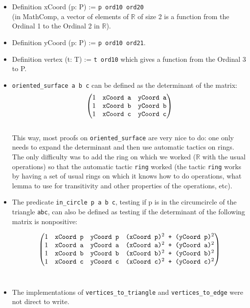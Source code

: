 \documentclass[a4paper,10pt]{article}
\def\definition#1#2{{\color{purple}Definition} {\color{blue}#1} := {\tt #2}}
\begin{document}
 \begin{itemize}
  \item \definition{xCoord (p: P)}{p ord10 ord20} \\(in {\sc MathComp}, a vector of elements of $\mathbb{R}$ of size 2 is a function from the Ordinal 1 to the Ordinal 2 in $\mathbb{R}$). 
  \item \definition{yCoord (p: P)}{p ord10 ord21}.
   \item \definition{vertex (t: T)}{t ord10} which gives a function from the Ordinal 3 to P.
\item {\tt oriented\_surface a b c} \label{oriented_surface} can be defined as the determinant of the matrix:
  $$ \left( \begin{matrix}
1 & \text{{\tt xCoord  a}} & \text{{\tt yCoord  a}}\\
1 & \text{{\tt xCoord  b}} & \text{{\tt yCoord  b}}\\
1 & \text{{\tt xCoord  c}} & \text{{\tt yCoord  c}}
\end{matrix} \right) $$\\
This way, most proofs on {\tt oriented\_surface} are very nice to do: one only needs to expand the determinant and then use automatic tactics on rings. The only difficulty was to add the ring on which we worked ($\mathbb{R}$ with the usual operations) so that the automatic tactic {\tt ring} worked (the tactic {\tt ring} works by having a set of usual rings on which it knows how to do operations, what lemma to use for transitivity and other properties of the operations, etc).

\item The predicate {\tt in\_circle p a b c}, testing if p is in the circumcircle of the triangle {\tt abc}, can also be defined as testing if the determinant of the following matrix is nonpositive:

  $$\left( \begin{matrix}
1 & \text{{\tt xCoord  p}} & \text{{\tt yCoord  p}}& \text{{\tt (xCoord  p)$^2$ + (yCoord  p)$^2$}}\\
1 & \text{{\tt xCoord  a}} & \text{{\tt yCoord  a}}& \text{{\tt (xCoord  a)$^2$ + (yCoord  a)$^2$}}\\
1 & \text{{\tt xCoord  b}} & \text{{\tt yCoord  b}}& \text{{\tt (xCoord  b)$^2$ + (yCoord  b)$^2$}}\\
1 & \text{{\tt xCoord  c}} & \text{{\tt yCoord  c}}& \text{{\tt (xCoord  c)$^2$ + (yCoord  c)$^2$}}
\end{matrix} \right) $$\\
\item The implementations of {\tt vertices\_to\_triangle} and {\tt vertices\_to\_edge} were not direct to write.


\end{itemize}
\end{document}
